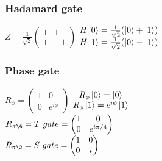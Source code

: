 \documentclass[11.5pt, paper=a4]{article}
\theoremstyle{definition}
\numberwithin{theorem}{section}
\begin{document}
\subsubsection{Hadamard gate}
    $Z = \frac{1}{\sqrt{2}}\begin{pmatrix}
    1 & 1\\
    1 & -1
    \end{pmatrix}$ $\begin{matrix}
    H\ket{0} = \frac{1}{\sqrt{2}}(\ket{0} + \ket{1})\\
    H\ket{1} = \frac{1}{\sqrt{2}}(\ket{0} - \ket{1})\\
    \end{matrix}$ 
\subsubsection{Phase gate}
    $R_{\phi} = \begin{pmatrix}
    1 & 0\\
    0 & e^{i\phi}
    \end{pmatrix}$ $\begin{matrix}
    R_{\phi}\ket{0} = \ket{0} \\
    R_{\phi}\ket{1} = e^{i\phi}\ket{1} 
    \end{matrix}$ \\
    $R_{\pi\4} = T\ gate = \begin{pmatrix}
    1 & 0\\
    0 & e^{i\pi/4}
    \end{pmatrix}$ \\
    $R_{\pi\2} = S\ gate = \begin{pmatrix}
    1 & 0\\
    0 & i
    \end{pmatrix}$\\
\end{document}
